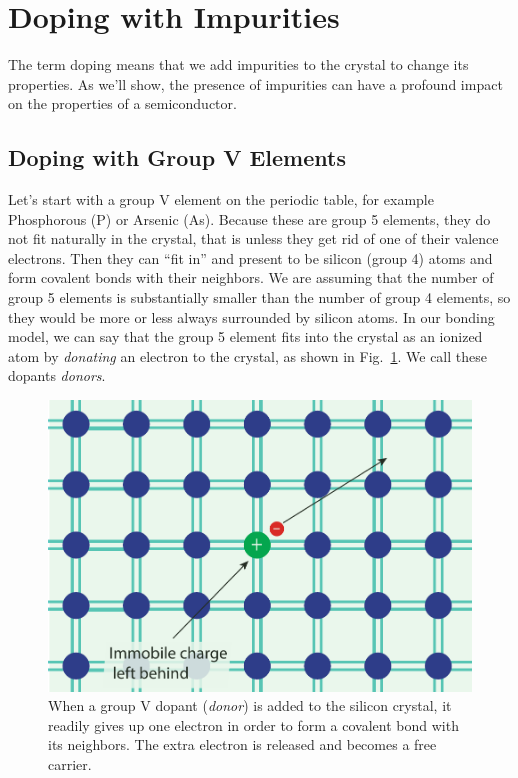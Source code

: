 \section{Doping with Impurities}
The term doping means that we add impurities to the crystal to change its properties.  As we’ll show, the presence of impurities can have a profound impact on the properties of a semiconductor.
\subsection{Doping with Group V Elements}
Let’s start with a group V element on the periodic table, for example Phosphorous (P) or Arsenic (As).  Because these are group 5 elements, they do not fit naturally in the crystal, that is unless they get rid of one of their valence electrons.  Then they can “fit in” and present to be silicon (group 4) atoms and form covalent bonds with their neighbors.  We are assuming that the number of group 5 elements is substantially smaller than the number of group 4 elements, so they would be more or less always surrounded by silicon atoms.  In our bonding model, we can say that the group 5 element fits into the crystal as an ionized atom by \emph{donating} an electron to the crystal, as shown in Fig.~\ref{fig:silicon_dopant_V}.   We call these dopants \emph{donors}.
\begin{figure}[tb]
\centering
\includegraphics[width=.5\columnwidth]{silicon_dopant_V}
\caption{When a group V dopant (\emph{donor}) is added to the silicon crystal, it readily gives up one electron in order to form a covalent bond with its neighbors.  The extra electron is released and becomes a free carrier.}
\label{fig:silicon_dopant_V}
\end{figure}
